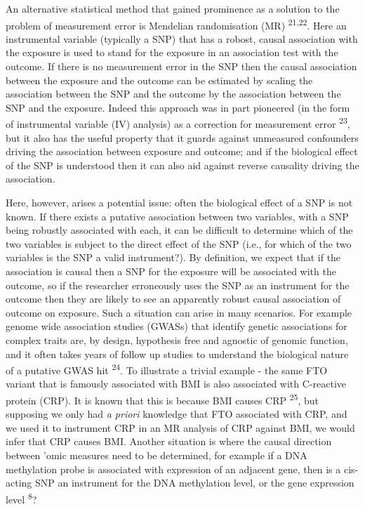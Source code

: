 \documentclass[]{article}
\begin{document}
An alternative statistical method that gained prominence as a solution
to the problem of measurement error is Mendelian randomisation (MR)
\textsuperscript{21,22}. Here an instrumental variable (typically a SNP)
that has a robost, causal association with the exposure is used to stand
for the exposure in an association test with the outcome. If there is no
measurement error in the SNP then the causal association between the
exposure and the outcome can be estimated by scaling the association
between the SNP and the outcome by the association between the SNP and
the exposure. Indeed this approach was in part pioneered (in the form of
instrumental variable (IV) analysis) as a correction for measurement
error \textsuperscript{23}, but it also has the useful property that it
guards against unmeasured confounders driving the association between
exposure and outcome; and if the biological effect of the SNP is
understood then it can also aid against reverse causality driving the
association.

Here, however, arises a potential issue: often the biological effect of
a SNP is not known. If there exists a putative association between two
variables, with a SNP being robustly associated with each, it can be
difficult to determine which of the two variables is subject to the
direct effect of the SNP (i.e., for which of the two variables is the
SNP a valid instrument?). By definition, we expect that if the
association is causal then a SNP for the exposure will be associated
with the outcome, so if the researcher erroneously uses the SNP as an
instrument for the outcome then they are likely to see an apparently
robust causal association of outcome on exposure. Such a situation can
arise in many scenarios. For example genome wide association studies
(GWASs) that identify genetic associations for complex traits are, by
design, hypothesis free and agnostic of genomic function, and it often
takes years of follow up studies to understand the biological nature of
a putative GWAS hit \textsuperscript{24}. To illustrate a trivial
example - the same FTO variant that is famously associated with BMI is
also associated with C-reactive protein (CRP). It is known that this is
because BMI causes CRP \textsuperscript{25}, but supposing we only had
\emph{a priori} knowledge that FTO associated with CRP, and we used it
to instrument CRP in an MR analysis of CRP against BMI, we would infer
that CRP causes BMI. Another situation is where the causal direction
between 'omic measures need to be determined, for example if a DNA
methylation probe is associated with expression of an adjacent gene,
then is a cis-acting SNP an instrument for the DNA methylation level, or
the gene expression level \textsuperscript{8}?
\end{document}

